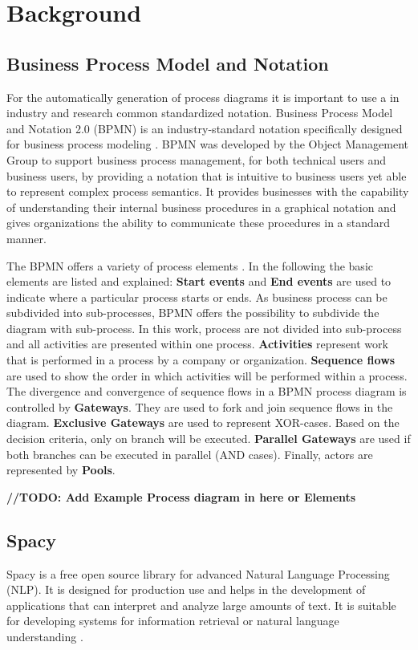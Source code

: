\chapter{Background}
\label{sec:background}
\section{Business Process Model and Notation}
For the automatically generation of process diagrams it is important to use a in industry and research common standardized notation. Business Process Model and Notation 2.0 (BPMN) is an industry-standard notation specifically designed for business process modeling \cite{aagesenBPMNModelingBusiness2015}. BPMN was developed by the Object Management Group to support business process management, for both technical users and business users, by providing a notation that is intuitive to business users yet able to represent complex process semantics. It provides businesses with the capability of understanding their internal business procedures in a graphical notation and gives organizations the ability to communicate these procedures in a standard manner. 

The BPMN offers a variety of process elements \cite{BusinessProcessModel}. In the following the basic elements are listed and explained:
\textbf{Start events} and \textbf{End events }are used to indicate where a particular process starts or ends. As business process can be subdivided into sub-processes, BPMN offers the possibility to subdivide the diagram with sub-process. In this work, process are not divided into sub-process and all activities are presented within one process. \textbf{Activities} represent work that is performed in a process by a company or organization. \textbf{Sequence flows} are used to show the order in which activities will be performed within a process. The divergence and convergence of sequence flows in a BPMN process diagram is controlled by \textbf{Gateways}. They are used to fork and join sequence flows in the diagram. \textbf{Exclusive Gateways} are used to represent XOR-cases. Based on the decision criteria, only on branch will be executed. \textbf{Parallel Gateways} are used if both branches can be executed in parallel (AND cases). Finally, actors are represented by \textbf{Pools}.

\textbf{//TODO: Add Example Process diagram in here or Elements}


\section{Spacy}
Spacy is a free open source library for advanced Natural Language Processing (NLP). It is designed for production use and helps in the development of applications that can interpret and analyze large amounts of text. It is suitable for developing systems for information retrieval or natural language understanding \cite{Honnibal_spaCy_Industrial-strength_Natural_2020}. 

